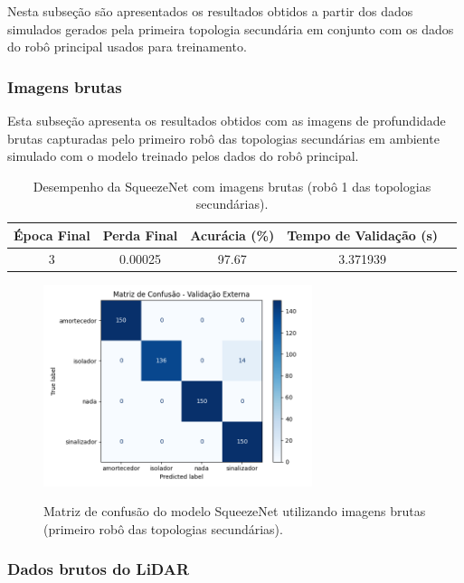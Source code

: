 Nesta subseção são apresentados os resultados obtidos a partir dos dados simulados gerados pela primeira topologia secundária em conjunto com os dados do robô principal usados para treinamento.

\subsubsection{Imagens brutas}

Esta subseção apresenta os resultados obtidos com as imagens de profundidade brutas
capturadas pelo primeiro robô das topologias secundárias em ambiente simulado com o modelo treinado pelos dados do robô principal.

\begin{table}[H]
\caption{Desempenho da SqueezeNet com imagens brutas (robô 1 das topologias secundárias).}
\centering
\begin{tabular}{ccccc}
\hline
\textbf{Época Final} & \textbf{Perda Final} & \textbf{Acurácia (\%)} & \textbf{Tempo de Validação (s)}  \\
\hline
3 & 0.00025 & 97.67 & 3.371939 \\
\hline
\end{tabular}
\fonte{}
\label{tab:resultados_nn_topo_secundarias}
\end{table}

\begin{figure}[H]
\centering
\caption{Matriz de confusão do modelo SqueezeNet utilizando imagens brutas (primeiro robô das topologias secundárias).}
\includegraphics[width=0.7\textwidth]{figuras/Resultados/multi_primeiro_Teste1.png}
\label{fig:mc_squeezenet_imgbrutas_robo1_sim_t1}
\fonte{}
\end{figure}

\subsubsection{Dados brutos do LiDAR}

